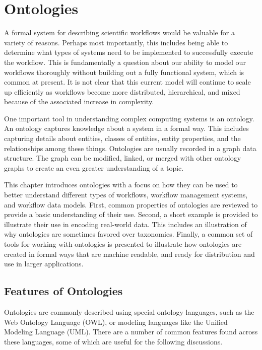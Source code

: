 \chapter{Ontologies} \label{ch:ontologies}

A formal system for describing scientific workflows would be valuable for a
variety of reasons. Perhaps most importantly, this includes being able to
determine what types of systems need to be implemented to successfully execute
the workflow. This is fundamentally a question about our ability to model our
workflows thoroughly without building out a fully functional system, which is
common at present. It is not clear that this current model will continue to
scale up efficiently as workflows become more distributed, hierarchical, and
mixed because of the associated increase in complexity. 

One important tool in understanding complex computing systems is an ontology.
An ontology captures knowledge about a system in a formal way. This includes
capturing details about entities, classes of entities, entity properties, and
the relationships among these things. Ontologies are usually recorded in a
graph data structure. The graph can be modified, linked, or merged with other
ontology graphs to create an even greater understanding of a topic.

This chapter introduces ontologies with a focus on how they can be used to
better understand different types of workflows, workflow management systems,
and workflow data models. First, common properties of ontologies are reviewed to
provide a basic understanding of their use. Second, a short example is provided
to illustrate their use in encoding real-world data. This includes an
illustration of why ontologies are sometimes favored over taxonomies. Finally, a
common set of tools for working with ontologies is presented to illustrate how
ontologies are created in formal ways that are machine readable, and ready for
distribution and use in larger applications.

\section{Features of Ontologies}

Ontologies are commonly described using special ontology languages, such as the
Web Ontology Language (OWL), or modeling languages like the Unified Modeling
Language (UML). There are a number of common features found across these
languages, some of which are useful for the following discussions. 

